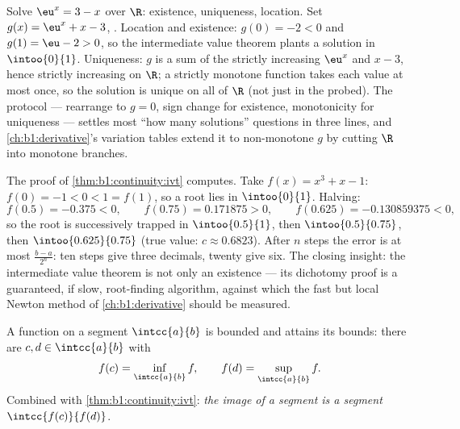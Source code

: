 \begin{example}\label{ex:b1:continuity:protocol}
Solve $\eu^x = 3 - x$ over $\R$: existence, uniqueness,
location. Set $g(x) = \eu^x + x - 3$, . Location and
existence: $g(0) = -2 < 0$ and $g(1) = \eu - 2 > 0$, so the
intermediate value theorem plants a solution in
$\intoo{0}{1}$. Uniqueness: $g$ is a sum of the strictly
increasing $\eu^x$ and $x - 3$, hence strictly increasing on
$\R$; a strictly monotone function takes each value at most
once, so the solution is unique on all of $\R$ (not just in the
 probed). The protocol --- rearrange to $g = 0$, sign
change for existence, monotonicity for uniqueness --- settles
most ``how many solutions'' questions in three lines, and
\cref{ch:b1:derivative}'s variation tables
extend it to non-monotone $g$ by cutting $\R$ into monotone
branches.
\end{example}

\begin{example}\label{ex:b1:continuity:dichotomy}
The proof of \cref{thm:b1:continuity:ivt} computes. Take $f(x) =
x^3 + x - 1$: $f(0) = -1 < 0 < 1 = f(1)$, so a root lies in
$\intoo{0}{1}$. Halving:
\[
f(0.5) = -0.375 < 0, \qquad
f(0.75) = 0.171875 > 0, \qquad
f(0.625) = -0.130859375 < 0 ,
\]
so the root is successively trapped in $\intoo{0.5}{1}$, then
$\intoo{0.5}{0.75}$, then $\intoo{0.625}{0.75}$ (true value:
$c \approx 0.6823$). After $n$ steps the error is at most
$\frac{b - a}{2^n}$: ten steps give three decimals, twenty give
six. The closing insight: the intermediate value theorem is not
only an existence  --- its dichotomy proof is a
guaranteed, if slow, root-finding algorithm, against which the
fast but local Newton method of \cref{ch:b1:derivative} should
be measured.
\end{example}

\begin{theorem}\label{thm:b1:continuity:evt}
A  function on a segment $\intcc{a}{b}$ is bounded and
attains its bounds: there are $c, d \in \intcc{a}{b}$ with
\[
f(c) = \inf_{\intcc{a}{b}} f,
\qquad
f(d) = \sup_{\intcc{a}{b}} f .
\]
Combined with \cref{thm:b1:continuity:ivt}: \emph{the 
image of a segment is a segment} $\intcc{f(c)}{f(d)}$.
\end{theorem}


